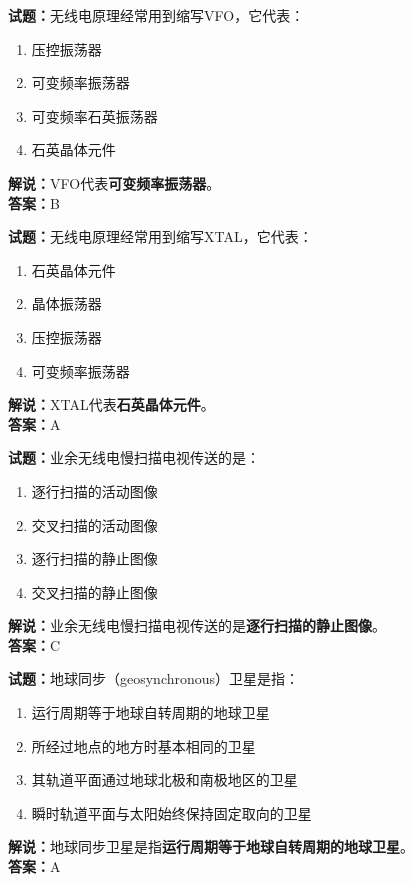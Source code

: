 \documentclass{ctexbook}
\begin{document}
\bigskip


\noindent\textbf{试题：}无线电原理经常用到缩写VFO，它代表：
\begin{enumerate}[leftmargin=3em]
\item 压控振荡器
\item 可变频率振荡器
\item 可变频率石英振荡器
\item 石英晶体元件
\end{enumerate}
\noindent\textbf{解说：}VFO代表\textbf{可变频率振荡器}。\\\noindent\textbf{答案：}B



\bigskip


\noindent\textbf{试题：}无线电原理经常用到缩写XTAL，它代表：
\begin{enumerate}[leftmargin=3em]
\item 石英晶体元件
\item 晶体振荡器
\item 压控振荡器
\item 可变频率振荡器
\end{enumerate}
\noindent\textbf{解说：}XTAL代表\textbf{石英晶体元件}。\\\noindent\textbf{答案：}A



\bigskip


\noindent\textbf{试题：}业余无线电慢扫描电视传送的是：
\begin{enumerate}[leftmargin=3em]
\item 逐行扫描的活动图像
\item 交叉扫描的活动图像
\item 逐行扫描的静止图像
\item 交叉扫描的静止图像
\end{enumerate}
\noindent\textbf{解说：}业余无线电慢扫描电视传送的是\textbf{逐行扫描的静止图像}。\\\noindent\textbf{答案：}C



\bigskip


\noindent\textbf{试题：}地球同步（geosynchronous）卫星是指：
\begin{enumerate}[leftmargin=3em]
\item 运行周期等于地球自转周期的地球卫星
\item 所经过地点的地方时基本相同的卫星
\item 其轨道平面通过地球北极和南极地区的卫星
\item 瞬时轨道平面与太阳始终保持固定取向的卫星
\end{enumerate}
\noindent\textbf{解说：}地球同步卫星是指\textbf{运行周期等于地球自转周期的地球卫星}。\\\noindent\textbf{答案：}A
\end{document}
